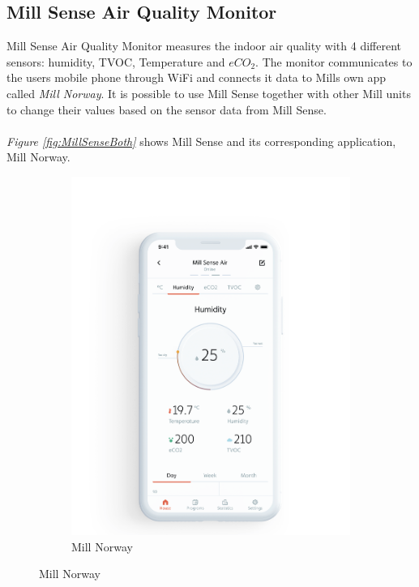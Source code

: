 \subsection{Mill Sense Air Quality Monitor}
Mill Sense Air Quality Monitor measures the indoor air quality with 4 different sensors: humidity, TVOC, Temperature and \(eCO_2\). \cite{Mill} The monitor communicates to the users mobile phone through WiFi and connects it data to Mills own app called \textit{Mill Norway}. It is possible to use Mill Sense together with other Mill units to change their values based on the sensor data from Mill Sense. 
\\\\
\textit{Figure \ref{fig:MillSenseBoth}} shows Mill Sense and its corresponding application, Mill Norway. 
\begin{figure} [!ht]
    \centering
    \begin{subfigure}{0.3\textwidth}
         \centering
         \includegraphics[width=1.5\textwidth]{figures/MillSenseApp.png}
         \caption{Mill Norway \cite{MillSense}}

\end{subfigure}
\end{figure}

